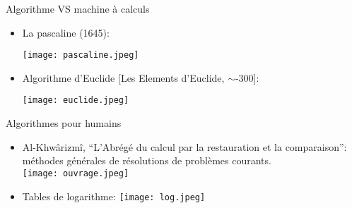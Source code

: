 \documentclass[10pt]{beamer}
\begin{document}
\begin{frame}{Algorithme VS machine \`a calculs}


  \begin{itemize}
  \item La pascaline (1645): \\
    \begin{center}
      \texttt{[image: pascaline.jpeg]}
      \end{center}

  \item Algorithme d'Euclide [Les Elements d'Euclide, $\sim$-300]: \\
    \begin{center}
      \texttt{[image: euclide.jpeg]}
      \end{center}
    
    
  \end{itemize}

\end{frame}


\begin{frame}{Algorithmes pour humains}


  \begin{itemize}
  \item Al-Khw\^arizm\^i, ``L'Abrégé du calcul par la restauration et la comparaison'': m\'ethodes g\'en\'erales de r\'esolutions de probl\`emes courants.  \\
      \texttt{[image: ouvrage.jpeg]}      

      \vspace{-1cm}
  \item Tables de logarithme: \texttt{[image: log.jpeg]}

    
  \end{itemize}

\end{frame}
\end{document}
